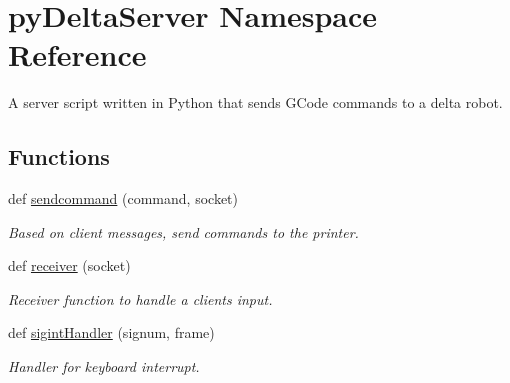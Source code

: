 \hypertarget{namespacepy_delta_server}{}\section{py\+Delta\+Server Namespace Reference}
\label{namespacepy_delta_server}


A server script written in Python that sends G\+Code commands to a delta robot.  


\subsection*{Functions}
\begin{DoxyCompactItemize}
\item 
def \hyperlink{namespacepy_delta_server_a7280de8d141fe345702baa55dae33147}{sendcommand} (command, socket)
\begin{DoxyCompactList}\small\item\em Based on client messages, send commands to the printer. \end{DoxyCompactList}\item 
def \hyperlink{namespacepy_delta_server_a71d558b4f7c47960fdafb193e3ddfaeb}{receiver} (socket)
\begin{DoxyCompactList}\small\item\em Receiver function to handle a client\textquotesingle{}s input. \end{DoxyCompactList}\item 
\hypertarget{namespacepy_delta_server_a9397c1b67caa01a9f72a22e3c2624d4c}{}def \hyperlink{namespacepy_delta_server_a9397c1b67caa01a9f72a22e3c2624d4c}{sigint\+Handler} (signum, frame)\label{namespacepy_delta_server_a9397c1b67caa01a9f72a22e3c2624d4c}

\begin{DoxyCompactList}\small\item\em Handler for keyboard interrupt. \end{DoxyCompactList}\end{DoxyCompactItemize}

